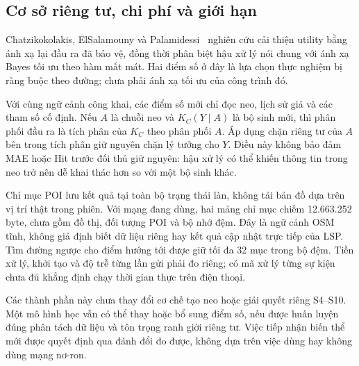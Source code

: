 \subsection{Cơ sở riêng tư, chi phí và giới hạn}

Chatzikokolakis, ElSalamouny và Palamidessi~\cite{chatzikokolakis2017utility} nghiên cứu cải thiện utility bằng ánh xạ lại đầu ra đã bảo vệ, đồng thời phân biệt hậu xử lý nói chung với ánh xạ Bayes tối ưu theo hàm mất mát. Hai điểm số ở đây là lựa chọn thực nghiệm bị ràng buộc theo đường; chưa phải ánh xạ tối ưu của công trình đó.

Với cùng ngữ cảnh công khai, các điểm số mới chỉ đọc neo, lịch sử giả và các tham số cố định. Nếu $A$ là chuỗi neo và $K_C(Y\mid A)$ là bộ sinh mới, thì phân phối đầu ra là tích phân của $K_C$ theo phân phối $A$. Áp dụng chặn riêng tư của $A$ bên trong tích phân giữ nguyên chặn lý tưởng cho $Y$. Điều này không bảo đảm MAE hoặc Hit trước đối thủ giữ nguyên: hậu xử lý có thể khiến thông tin trong neo trở nên dễ khai thác hơn so với một bộ sinh khác.

Chỉ mục POI lưu kết quả tại toàn bộ trạng thái làn, không tải bản đồ dựa trên vị trí thật trong phiên. Với mạng đang dùng, hai mảng chỉ mục chiếm 12.663.252 byte, chưa gồm đồ thị, đối tượng POI và bộ nhớ đệm. Đây là ngữ cảnh OSM tĩnh, không giả định biết dữ liệu riêng hay kết quả cập nhật trực tiếp của LSP. Tìm đường ngược cho điểm hướng tới được giữ tối đa 32 mục trong bộ đệm. Tiền xử lý, khởi tạo và độ trễ từng lần gửi phải đo riêng; có mã xử lý từng sự kiện chưa đủ khẳng định chạy thời gian thực trên điện thoại.

Các thành phần này chưa thay đổi cơ chế tạo neo hoặc giải quyết riêng S4--S10. Một mô hình học vẫn có thể thay hoặc bổ sung điểm số, nếu được huấn luyện đúng phân tách dữ liệu và tôn trọng ranh giới riêng tư. Việc tiếp nhận biến thể mới được quyết định qua đánh đổi đo được, không dựa trên việc dùng hay không dùng mạng nơ-ron.
